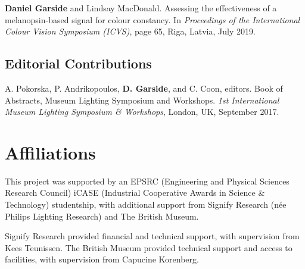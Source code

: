 {\textbf{Daniel Garside} and Lindsay MacDonald. Assessing the effectiveness of a melanopsin-based signal for colour constancy. In \textit{Proceedings of the International Colour Vision Symposium (ICVS)}, page 65, Riga, Latvia, July 2019. 
\bigskip

\subsection*{Editorial Contributions}
A. Pokorska, P. Andrikopoulos, \textbf{D. Garside}, and C. Coon, editors. Book of Abstracts, Museum Lighting Symposium and Workshops.  \textit{1st International Museum Lighting Symposium \& Workshops}, London, UK, September 2017. 

}

\section{Affiliations}
This project was supported by an EPSRC (Engineering and Physical Sciences Research Council) iCASE (Industrial Cooperative Awards in Science \& Technology) studentship, with additional support from Signify Research (née Philips Lighting Research) and The British Museum.

Signify Research provided financial and technical support, with supervision from Kees Teunissen. The British Museum provided technical support and access to facilities, with supervision from Capucine Korenberg. 